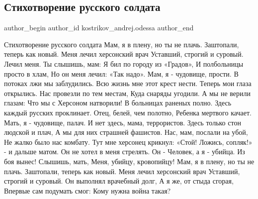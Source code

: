  
 
 
 
 
 
\subsection{Стихотворение русского солдата}
\label{sec:03_03_2022.fb.kostrikov_andrej.odessa.1.stih_russkogo_soldata}
 
\ifcmt
 author_begin
   author_id kostrikov_andrej.odessa
 author_end
\fi



\raggedcolumns
\begin{multicols}{2} %
\setlength{\parindent}{0pt}

\obeycr
Стихотворение русского солдата
Мам, я в плену, но ты не плачь.
Заштопали, теперь как новый.
Меня лечил херсонский врач
Уставший, строгий и суровый.
\smallskip
Лечил меня. Ты слышишь, мам:
Я бил по городу из «Градов»,
И полбольницы просто в хлам,
Но он меня лечил: «Так надо».
\smallskip
Мам, я - чудовище, прости.
В потоках лжи мы заблудились.
Всю жизнь мне этот крест нести.
Теперь мои глаза открылись.
\smallskip
Нас провезли по тем местам,
Куда снаряды угодили.
А мы не верили глазам:
Что мы с Херсоном натворили!
\smallskip
В больницах раненых полно.
Здесь каждый русских проклинает.
Отец, белей, чем полотно,
Ребенка мертвого качает.
\smallskip
Мать, я - чудовище, палач.
И нет здесь, мама, террористов.
Здесь только стон людской и плач,
А мы для них страшней фашистов.
\smallskip
Нас, мам, послали на убой,
Не жалко было нас комбату.
Тут мне херсонец крикнул: «Стой!
Ложись, сопляк!» - и дальше матом.
\smallskip
Он не хотел в меня стрелять.
Он - Человек, а я - убийца.
Из боя вынес! Слышишь, мать,
Меня, убийцу, кровопийцу!
Мам, я в плену, но ты не плачь.
\smallskip
Заштопали, теперь как новый.
Меня лечил херсонский врач
Уставший, строгий и суровый.
\smallskip
Он выполнял врачебный долг,
А я же, от стыда сгорая,
Впервые сам подумать смог:
Кому нужна война такая?
\restorecr
\end{multicols} %

